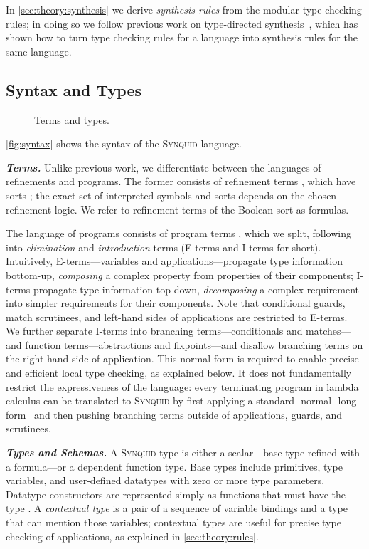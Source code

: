 \documentclass[10pt,preprint]{sigplanconf-pldi16}
\theoremstyle{definition}
\newcommand{\custompar}[1]{\parskip 0pt \textbf{\textit{#1}}}
\newcommand{\lang}{\textsc{Synquid}\xspace}
\begin{document}
In \autoref{sec:theory:synthesis} we derive \emph{synthesis rules} from the modular type checking rules;
in doing so we follow previous work on type-directed synthesis~\cite{OseraZd15,InalaQLS15},
which has shown how to turn type checking rules for a language into synthesis rules for the same language.


\subsection{Syntax and Types}\label{sec:theory:syntax}

\begin{figure}
\small

\caption{Terms and types.}\label{fig:syntax}
\end{figure}

\autoref{fig:syntax} shows the syntax of the \lang language.

\custompar{Terms.}
Unlike previous work, we differentiate between the languages of refinements and programs.
The former consists of refinement terms , which have sorts ;
the exact set of interpreted symbols and sorts depends on the chosen refinement logic.
We refer to refinement terms of the Boolean sort  as formulas.

The language of programs consists of program terms , 
which we split, following~\cite{OseraZd15} into \emph{elimination} and \emph{introduction} terms (E-terms and I-terms for short).
Intuitively, E-terms---variables and applications---propagate type information bottom-up,
\emph{composing} a complex property from properties of their components;
I-terms propagate type information top-down,
\emph{decomposing} a complex requirement into simpler requirements for their components.
Note that conditional guards, match scrutinees, and left-hand sides of applications are restricted to E-terms.
We further separate I-terms into branching terms---conditionals and matches---and function terms---abstractions and fixpoints---and disallow branching terms on the right-hand side of application.
This normal form is required to enable precise and efficient local type checking, as explained below.
It does not fundamentally restrict the expressiveness of the language:
every terminating program in lambda calculus can be translated to \lang
by first applying a standard -normal -long form~\cite{GveroKuKuPi13,OseraZd15}
and then pushing branching terms outside of applications, guards, and scrutinees.

\custompar{Types and Schemas.}
A \lang type is either a scalar---base type refined with a formula---or a dependent function type.
Base types include primitives, type variables, and user-defined datatypes with zero or more type parameters. 
Datatype constructors are represented simply as functions
that must have the type .
A \emph{contextual type} is a pair of a sequence of variable bindings and a type that can mention those variables;
contextual types are useful for precise type checking of applications, as explained in \autoref{sec:theory:rules}.
\end{document}
